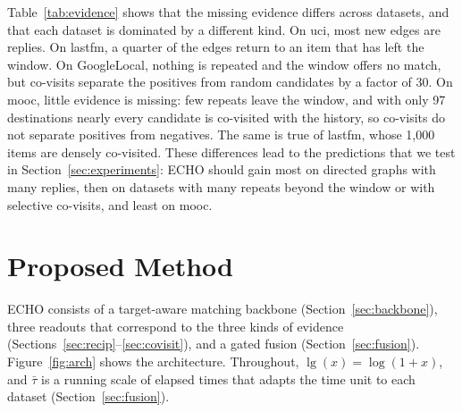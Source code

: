 \documentclass[twoside]{article}
\newcommand{\ours}{ECHO}
\newcommand{\lone}{\operatorname{lg}}
\begin{document}
Table~\ref{tab:evidence} shows that the missing evidence differs across datasets, and that each dataset is dominated by a different kind. On uci, most new edges are replies. On lastfm, a quarter of the edges return to an item that has left the window. On GoogleLocal, nothing is repeated and the window offers no match, but co-visits separate the positives from random candidates by a factor of 30. On mooc, little evidence is missing: few repeats leave the window, and with only 97 destinations nearly every candidate is co-visited with the history, so co-visits do not separate positives from negatives. The same is true of lastfm, whose 1,000 items are densely co-visited. These differences lead to the predictions that we test in Section~\ref{sec:experiments}: \ours{} should gain most on directed graphs with many replies, then on datasets with many repeats beyond the window or with selective co-visits, and least on mooc.

\section{Proposed Method}

\ours{} consists of a target-aware matching backbone (Section~\ref{sec:backbone}), three readouts that correspond to the three kinds of evidence (Sections~\ref{sec:recip}--\ref{sec:covisit}), and a gated fusion (Section~\ref{sec:fusion}). Figure~\ref{fig:arch} shows the architecture. Throughout, $\lone(x)=\log(1+x)$, and $\bar{\tau}$ is a running scale of elapsed times that adapts the time unit to each dataset (Section~\ref{sec:fusion}).
\end{document}
